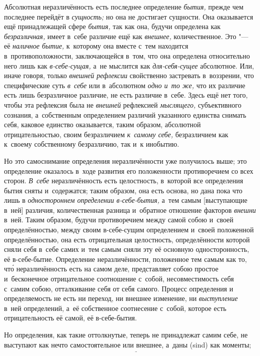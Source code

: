 
Абсолютная неразличённость есть последнее определение {\em бытия,} прежде чем
последнее перейдёт в {\em сущность;} но она не достигает сущности. Она
оказывается ещё принадлежащей сфере {\em бытия,} так как она, будучи определена
как {\em безразличная,} имеет в~себе различие ещё как {\em внешнее,}
количественное. Это "--- её {\em наличное бытие,} к~которому она вместе с~тем
находится в~противоположности, заключающейся в~том, что она определена
относительно него лишь как {\em в-себе-сущая,} а~не мыслится как
{\em для-себя-сущее} абсолютное. Или, иначе говоря, только
{\em внешней рефлексии} свойственно застревать в~воззрении, что специфические
суть {\em в~себе} или в~абсолютном {\em одно и~то же,} что их различие есть
лишь безразличное различие, не есть различие в~себе. Здесь ещё нет того, чтобы
эта рефлексия была не {\em внешней} рефлексией {\em мыслящего,} субъективного
сознания, а~собственным определением различий указанного единства снимать себя,
каковое единство оказывается, таким образом, абсолютной отрицательностью, своим
безразличием {\em к~самому себе,} безразличием как к~своему собственному
безразличию, так и~к инобытию.

Но это самоснимание определения неразличённости уже получилось выше; это
определение оказалось в~ходе развития его положенности противоречием со всех
сторон. {\em В~себе} неразличённость есть целостность, в~которой все
определения бытия сняты и~содержатся; таким образом, она есть основа, но дана
пока что лишь в {\em одностороннем определении в-себе-бытия,} а~тем самым
[выступающие в~ней] различия, количественная разница и~обратное отношение
факторов {\em внешни} в~ней. Таким образом, будучи противоречием между самой
собою и~своей определённостью, между своим в-себе-сущим определением и~своей
положенной определённостью, она есть отрицательная целостность, определённости
которой сняли себя в~себе самих и~тем самым сняли эту её основную
односторонность, её в-себе-бытие. Определение неразличённости, положенное тем
самым как то, чт\'{о} неразличённость есть на самом деле, представляет собою
простое и~бесконечное отрицательное соотношение с~собой, несовместимость себя
с~самим собою, отталкивание себя от себя самого. Процесс определения и
определяемость не есть ни переход, ни внешнее изменение, ни {\em выступление}
в~ней определений, а~её собственное соотнесение с~собой, которое есть
отрицательность её самой, её в-себе-бытия.

Но определения, как такие оттолкнутые, теперь не принадлежат самим себе, не
выступают как нечто самостоятельное или внешнее, а~даны (sind) как моменты; они
принадлежат, во-первых, {\em сущему в~себе} единству, не отпускаются им, а
носимы им как субстратом и~наполнены только им; а, во-вторых, как определения,
имманентные {\em для-себя-сущему} единству, они имеют бытие лишь через его
отталкивание от себя. Вместо того чтобы быть {\em сущими,} как это мы видели во
всей сфере бытия, они, теперь всецело суть только {\em положенные,} всецело
имеют то определение и~значение, что они {\em соотнесены} со своим единством и,
стало быть, каждое из них соотнесено со своим иным и~с~отрицанием, "--- они
отмечены этой своей соотносительностью (Rela\-tivi\-tät).

